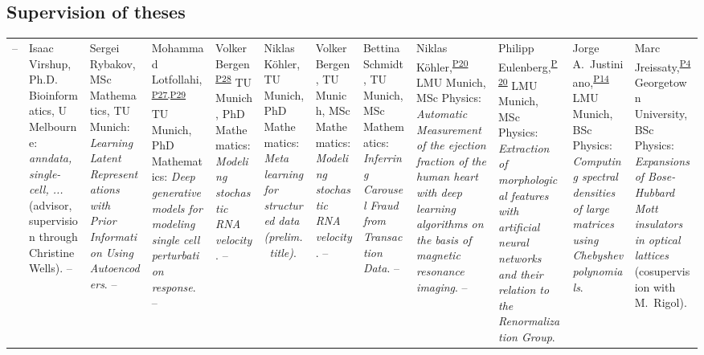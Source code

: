 \subsection*{Supervision of theses}
\vspace{-1em}
\begin{longtable}[t]{R{\widthC} p{\widthB}}
 -- 
& Isaac Virshup, Ph.D. Bioinformatics, U Melbourne: \textit{anndata, single-cell, ...} (advisor, supervision through Christine Wells).\newline
{} -- 
& Sergei Rybakov, MSc Mathematics, TU Munich: \textit{Learning Latent Representations with Prior Information Using Autoencoders}.\newline
{} -- 
& Mohammad Lotfollahi,\textsuperscript{\hyperlink{P27}{P27,P29}} TU Munich, PhD Mathematics: \textit{Deep generative models for modeling single cell perturbation response}. \newline
{} -- 
& Volker Bergen\textsuperscript{\hyperlink{P28}{P28}} TU Munich, PhD Mathematics: \textit{Modeling stochastic RNA velocity}. \newline
{} -- 
& Niklas Köhler, TU Munich, PhD Mathematics: \textit{Meta learning for structured data (prelim.~title)}. \newline
{}  
& Volker Bergen, TU Munich, MSc Mathematics: \textit{Modeling stochastic RNA velocity}. \newline
{} --   
& Bettina Schmidt, TU Munich, MSc Mathematics: \textit{Inferring Carousel Fraud from Transaction Data}.  \newline
{} --   
& Niklas Köhler,\textsuperscript{\hyperlink{P20}{P20}} LMU Munich, MSc Physics: \textit{Automatic Measurement of the ejection fraction of the human heart with deep learning algorithms on the basis of magnetic resonance imaging}.  \newline
{} --   
& Philipp Eulenberg,\textsuperscript{\hyperlink{P20}{P20}} LMU Munich, MSc Physics: \textit{Extraction of morphological features
with artificial neural networks and their relation to the  Renormalization Group}.  \newline
{} 
& Jorge A.~Justiniano,\textsuperscript{\hyperlink{P14}{P14}} LMU Munich, BSc Physics: \textit{Computing spectral densities of large matrices using Chebyshev polynomials}. \newline
{} 
& Marc Jreissaty,\textsuperscript{\hyperlink{P4}{P4}} Georgetown University, BSc Physics: \textit{Expansions of Bose-Hubbard Mott insulators in optical lattices} (cosupervision with M.~Rigol). \newline
\end{longtable}

